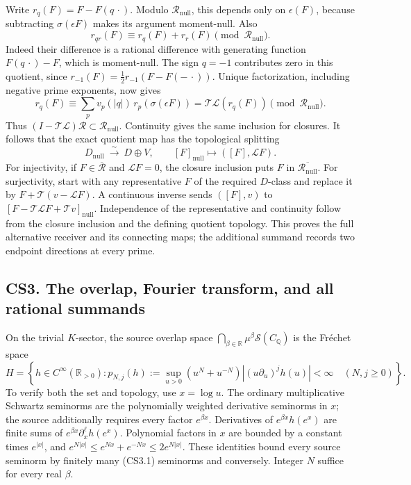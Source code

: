 Write \(r_q(F)=F-F(q\,\cdot)\). Modulo \(\mathcal R_{\mathrm{null}}\),
this depends only on \(\epsilon(F)\), because subtracting
\(\sigma(\epsilon F)\) makes its argument moment-null. Also \[
r_{qr}(F)\equiv r_q(F)+r_r(F)
\pmod{\mathcal R_{\mathrm{null}}}.
\tag{CS2A.8}
\] Indeed their difference is a rational difference with generating
function \(F(q\,\cdot)-F\), which is moment-null. The sign \(q=-1\)
contributes zero in this quotient, since
\(r_{-1}(F)=\tfrac12r_{-1}(F-F(-\,\cdot))\). Unique factorization,
including negative prime exponents, now gives \[
r_q(F)\equiv
\sum_p v_p(|q|)\,r_p(\sigma(\epsilon F))
=\mathscr T\mathscr L(r_q(F))
\pmod{\mathcal R_{\mathrm{null}}}.
\tag{CS2A.9}
\] Thus \((I-\mathscr T\mathscr L)\mathcal R\subset
\mathcal R_{\mathrm{null}}\). Continuity gives the same inclusion for
closures. It follows that the exact quotient map has the topological
splitting \[
\boxed{
D_{\mathrm{null}}\ \xrightarrow{\ \sim\ }\ D\oplus V,\qquad
[F]_{\mathrm{null}}\longmapsto([F],\mathscr L F).
}
\tag{CS2A.10}
\] For injectivity, if \(F\in\overline{\mathcal R}\) and
\(\mathscr LF=0\), the closure inclusion puts \(F\) in
\(\overline{\mathcal R_{\mathrm{null}}}\). For surjectivity, start with
any representative \(F\) of the required \(D\)-class and replace it by
\(F+\mathscr T(v-\mathscr LF)\). A continuous inverse sends \(([F],v)\)
to \([F-\mathscr T\mathscr LF+\mathscr T v]_{\mathrm{null}}\).
Independence of the representative and continuity follow from the
closure inclusion and the defining quotient topology. This proves the
full alternative receiver and its connecting maps; the additional
summand records two endpoint directions at every prime.

\subsection{CS3. The overlap, Fourier transform, and all rational
summands}\label{cs3.-the-overlap-fourier-transform-and-all-rational-summands}

On the trivial \(K\)-sector, the source overlap space
\(\bigcap_{\beta\in\mathbb R}\mu^\beta\mathcal S(C_{\mathbb Q})\) is the
Fréchet space \[
H=\left\{h\in C^\infty(\mathbb R_{>0}):
p_{N,j}(h):=\sup_{u>0}(u^N+u^{-N})
|(u\partial_u)^jh(u)|<\infty\quad(N,j\ge0)\right\}.
\tag{CS3.1}
\] To verify both the set and topology, use \(x=\log u\). The ordinary
multiplicative Schwartz seminorms are the polynomially weighted
derivative seminorms in \(x\); the source additionally requires every
factor \(e^{\beta x}\). Derivatives of \(e^{\beta x}h(e^x)\) are finite
sums of \(e^{\beta x}\partial_x^\ell h(e^x)\). Polynomial factors in
\(x\) are bounded by a constant times \(e^{|x|}\), and
\(e^{N|x|}\le e^{Nx}+e^{-Nx}\le2e^{N|x|}\). These identities bound every
source seminorm by finitely many (CS3.1) seminorms and conversely.
Integer \(N\) suffice for every real \(\beta\).

